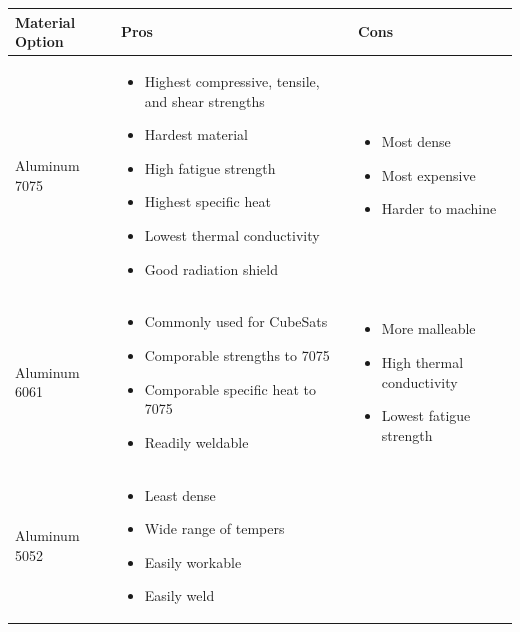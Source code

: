 \begin{table}[H]
\centering
\begin{tabular}{|p{}|p{}|p{}|} 
\hline
\textbf{Material Option} & \textbf{Pros} & \textbf{Cons}
\\
\hline
     Aluminum 7075
     &
    \begin{itemize}
        \item Highest compressive, tensile, and shear strengths
        \item Hardest material
        \item High fatigue strength
        \item Highest specific heat
        \item Lowest thermal conductivity
        \item Good radiation shield
    \end{itemize}
    &
    \begin{itemize}
        \item Most dense
        \item Most expensive
        \item Harder to machine
    \end{itemize}
    \\
\hline
     Aluminum 6061
     &
    \begin{itemize}
        \item Commonly used for CubeSats
        \item Comporable strengths to 7075
        \item Comporable specific heat to 7075
        \item Readily weldable
    \end{itemize}
    &
        \begin{itemize}
        \item More malleable
        \item High thermal conductivity
        \item Lowest fatigue strength
    \end{itemize}
    \\
\hline
    Aluminum 5052
    &
    \begin{itemize}
        \item Least dense
        \item Wide range of tempers
        \item Easily workable
        \item Easily weld
    \end{itemize}
    &

\end{tabular}
\end{table}

